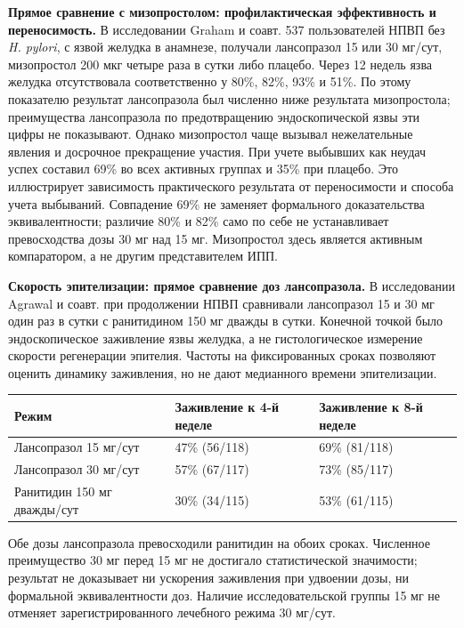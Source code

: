\documentclass[11pt,a4paper,notitlepage]{report}
\newcommand{\Hp}{\textit{H. pylori}}
\newcommand{\src}[1]{\unskip\space\cite{#1}}
\begin{document}
\textbf{Прямое сравнение с мизопростолом: профилактическая эффективность и переносимость.} В исследовании Graham и соавт. 537 пользователей НПВП без \Hp, с язвой желудка в анамнезе, получали лансопразол 15 или 30 мг/сут, мизопростол 200 мкг четыре раза в сутки либо плацебо. Через 12 недель язва желудка отсутствовала соответственно у 80\%, 82\%, 93\% и 51\%. По этому показателю результат лансопразола был численно ниже результата мизопростола; преимущества лансопразола по предотвращению эндоскопической язвы эти цифры не показывают. Однако мизопростол чаще вызывал нежелательные явления и досрочное прекращение участия. При учете выбывших как неудач успех составил 69\% во всех активных группах и 35\% при плацебо. Это иллюстрирует зависимость практического результата от переносимости и способа учета выбываний. Совпадение 69\% не заменяет формального доказательства эквивалентности; различие 80\% и 82\% само по себе не устанавливает превосходства дозы 30 мг над 15 мг. Мизопростол здесь является активным компаратором, а не другим представителем ИПП.\src{misotrial}

\textbf{Скорость эпителизации: прямое сравнение доз лансопразола.} В исследовании Agrawal и соавт. при продолжении НПВП сравнивали лансопразол 15 и 30 мг один раз в сутки с ранитидином 150 мг дважды в сутки. Конечной точкой было эндоскопическое заживление язвы желудка, а не гистологическое измерение скорости регенерации эпителия. Частоты на фиксированных сроках позволяют оценить динамику заживления, но не дают медианного времени эпителизации.\src{nsaidagrawal2000}
\begin{longtable}{P{0.44\textwidth}P{0.22\textwidth}P{0.22\textwidth}}
\toprule
Режим & Заживление к 4-й неделе & Заживление к 8-й неделе \\
\midrule
\endhead
Лансопразол 15 мг/сут & 47\% (56/118) & 69\% (81/118) \\
Лансопразол 30 мг/сут & 57\% (67/117) & 73\% (85/117) \\
Ранитидин 150 мг дважды/сут & 30\% (34/115) & 53\% (61/115) \\
\bottomrule
\end{longtable}
Обе дозы лансопразола превосходили ранитидин на обоих сроках. Численное преимущество 30 мг перед 15 мг не достигало статистической значимости; результат не доказывает ни ускорения заживления при удвоении дозы, ни формальной эквивалентности доз. Наличие исследовательской группы 15 мг не отменяет зарегистрированного лечебного режима 30 мг/сут.\src{nsaidagrawal2000,uslabel,hpra}
\end{document}
